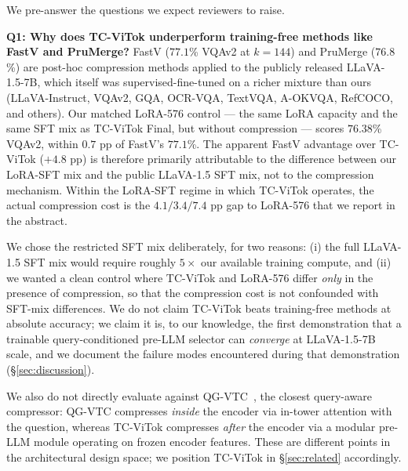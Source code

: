\documentclass{article}
\begin{document}
We pre-answer the questions we expect reviewers to raise.

\textbf{Q1: Why does TC-ViTok underperform training-free methods like FastV
and PruMerge?}
FastV ($77.1$\% VQAv2 at $k{=}144$) and PruMerge ($76.8$\%) are post-hoc
compression methods applied to the publicly released LLaVA-1.5-7B, which
itself was supervised-fine-tuned on a richer mixture than ours
(LLaVA-Instruct, VQAv2, GQA, OCR-VQA, TextVQA, A-OKVQA, RefCOCO, and
others). Our matched LoRA-576 control --- the same LoRA capacity and the same
SFT mix as TC-ViTok Final, but without compression --- scores $76.38$\% VQAv2,
within $0.7$ pp of FastV's $77.1$\%. The apparent FastV advantage over
TC-ViTok ($+4.8$ pp) is therefore primarily attributable to the difference
between our LoRA-SFT mix and the public LLaVA-1.5 SFT mix, not to the
compression mechanism. Within the LoRA-SFT regime in which TC-ViTok operates,
the actual compression cost is the $4.1/3.4/7.4$ pp gap to LoRA-576 that we
report in the abstract.

We chose the restricted SFT mix deliberately, for two reasons: (i) the full
LLaVA-1.5 SFT mix would require roughly $5{\times}$ our available training
compute, and (ii) we wanted a clean control where TC-ViTok and LoRA-576 differ
\emph{only} in the presence of compression, so that the compression cost is not
confounded with SFT-mix differences. We do not claim TC-ViTok beats
training-free methods at absolute accuracy; we claim it is, to our knowledge,
the first demonstration that a trainable query-conditioned pre-LLM selector can
\emph{converge} at LLaVA-1.5-7B scale, and we document the failure modes
encountered during that demonstration (\S\ref{sec:discussion}).

We also do not directly evaluate against QG-VTC~\cite{li2025qgvtc}, the closest
query-aware compressor: QG-VTC compresses \emph{inside} the encoder via
in-tower attention with the question, whereas TC-ViTok compresses \emph{after}
the encoder via a modular pre-LLM module operating on frozen encoder features.
These are different points in the architectural design space; we position
TC-ViTok in \S\ref{sec:related} accordingly.
\end{document}
